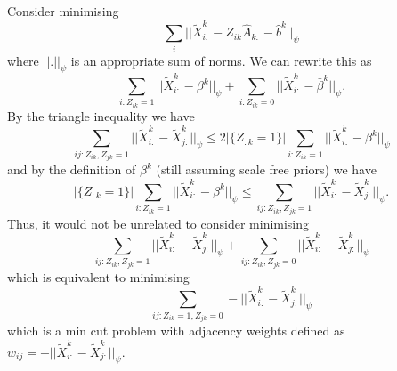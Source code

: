 \documentclass{article}
\numberwithin{equation}{section}
\numberwithin{thm}{section}
\def\IBP{Z}
\def\Weights{A}
\def\Residuals{\tilde{X}}
\def\bias{b}
\def\centre{\beta}
\begin{document}
Consider minimising
\begin{equation}
\sum_i||\Residuals^k_{i:} - \IBP_{ik}\hat{\Weights}_{k:} - \hat{\bias}^k||_\psi
\end{equation}
where $||.||_\psi$ is an appropriate sum of norms. We can rewrite this as
\begin{equation}
\sum_{i: \IBP_{ik} = 1}||\Residuals^k_{i:} - \centre^k||_\psi + \sum_{i: \IBP_{ik} = 0}||\Residuals^k_{i:} - \bar{\centre}^k||_\psi.
\end{equation}
By the triangle inequality we have
\begin{equation}
\sum_{ij: \IBP_{ik},\IBP_{jk} = 1}||\Residuals^k_{i:} - \Residuals^k_{j:}||_\psi \leq 2|\{\IBP_{:k} = 1\}|\sum_{i: \IBP_{ik} = 1}||\Residuals^k_{i:} - \centre^k||_\psi
\end{equation}
and by the definition of $\centre^k$ (still assuming scale free priors) we have
\begin{equation}
|\{\IBP_{:k} = 1\}|\sum_{i: \IBP_{ik} = 1}||\Residuals^k_{i:} - \centre^k||_\psi \leq \sum_{ij: \IBP_{ik},\IBP_{jk} = 1}||\Residuals^k_{i:} - \Residuals^k_{j:}||_\psi.
\end{equation}
Thus, it would not be unrelated to consider minimising
\begin{equation}
\sum_{ij: \IBP_{ik},\IBP_{jk} = 1}||\Residuals^k_{i:} - \Residuals^k_{j:}||_\psi + \sum_{ij: \IBP_{ik},\IBP_{jk} = 0}||\Residuals^k_{i:} - \Residuals^k_{j:}||_\psi
\end{equation}
which is equivalent to minimising
\begin{equation}
\sum_{ij: \IBP_{ik} = 1, \IBP_{jk} = 0}-||\Residuals^k_{i:} - \Residuals^k_{j:}||_\psi 
\end{equation}
which is a min cut problem with adjacency weights defined as $w_{ij} = -||\Residuals^k_{i:} - \Residuals^k_{j:}||_\psi$.
\end{document}
